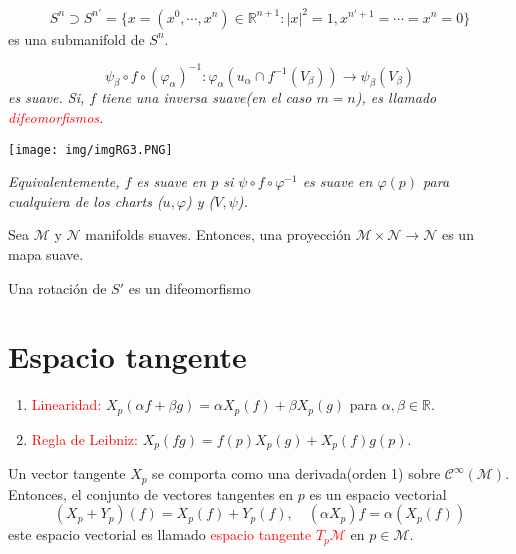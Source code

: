 \documentclass[../main]{subfiles}
\begin{document}
\begin{adjustwidth}{0pt}{-100pt}
\ejemplo{} 
\begin{equation}
    S^n \supset S^{n'}=\{ x=(x^0, \cdots, x^n)\in \mathbb{R}^{n+1}:|x|^2=1, x^{n'+1}=\cdots=x^n=0\}
\end{equation}
es una submanifold de $S^n$.

\begin{equation}
    \psi_{\beta}\circ f \circ (\varphi_{\alpha})^{-1}: \varphi_{\alpha}(u_{\alpha} \cap f^{-1}(V_{\beta}))\rightarrow \psi_{\beta}(V_{\beta})
\end{equation}
\textit{es suave. Si, $f$ tiene una inversa suave(en el caso $m=n$), es llamado \textcolor{red}{difeomorfismos}.}

\begin{center}
    \texttt{[image: img/imgRG3.PNG]}
\end{center}

\textit{Equivalentemente, $f$ es suave en $p$ si $\psi \circ f\circ \varphi^{-1}$ es suave en $\varphi(p)$ para cualquiera de los charts ($u, \varphi$) y ($V, \psi$).}

\ejemplo{}
Sea $\mathcal{M}$ y $\mathcal{N}$ manifolds suaves. Entonces, una proyección $\mathcal{M} \times \mathcal{N} \rightarrow \mathcal{N}$ es un mapa suave.

\ejemplo{}
Una rotación de $S'$ es un difeomorfismo

\section{Espacio tangente}\label{part1.3}
\begin{enumerate}
    \item \textcolor{red}{Linearidad:} $X_p(\alpha f+\beta g)=\alpha X_p(f)+\beta X_p(g)$ para $\alpha, \beta \in \mathbb{R}$.
    \item \textcolor{red}{Regla de Leibniz:} $X_p(fg)=f(p)X_p(g)+X_p(f)g(p)$.
\end{enumerate}

Un vector tangente $X_p$ se comporta como una derivada(orden 1) sobre $\mathcal{C}^{\infty}(\mathcal{M})$. Entonces, el conjunto de vectores tangentes en $p$ es un espacio vectorial
\begin{equation}
    (X_p+Y_p)(f)=X_p(f)+Y_p(f),\quad (\alpha X_p)f=\alpha(X_p(f))
\end{equation}
este espacio vectorial es llamado \textcolor{red}{espacio tangente $T_p \mathcal{M}$} en $p\in \mathcal{M}$.


\end{adjustwidth}
\end{document}
